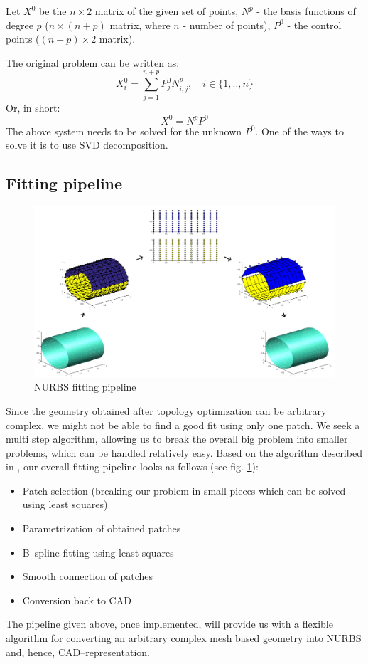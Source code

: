 Let $X^{0}$ be the $n \times 2$ matrix of the given set of points, $N^{p}$ - the basis functions of degree $p$ ($n \times (n+p)$ matrix, where $n$ - number of points), $P^{0}$ - the control points ($(n+p) \times 2$ matrix).

The original problem can be written as:
\begin{equation}
X_{i}^{0} = \sum\limits_{j=1}^{n+p} P_{j}^{0} N_{i,j}^{p}, \quad i \in \{1,..,n\}
\end{equation}
Or, in short:
\begin{equation}
X^{0} = N^{p} P^{0}
\end{equation}
The above system needs to be solved for the unknown $P^{0}$. One of the ways to solve it is to use SVD decomposition. 

\subsection{Fitting pipeline}
\begin{figure}
\centering
  \includegraphics[width=.85\linewidth]{Fitting_workflow.png}
  \caption{NURBS fitting pipeline}
  \label{fig:fitting_pipeline}
\end{figure}
Since the geometry obtained after topology optimization can be arbitrary complex, we might not be able to find a good fit using only one patch. We seek a multi step algorithm, allowing us to break the overall big problem into smaller problems, which can be handled relatively easy.
Based on the algorithm described in \cite{eck1996automatic}, our overall fitting pipeline looks as follows (see fig. \ref{fig:fitting_pipeline}):
\begin{itemize}
	\item Patch selection (breaking our problem in small pieces which can be solved using least squares)
	\item Parametrization of obtained patches
	\item B--spline fitting using least squares
	\item Smooth connection of patches
	\item Conversion back to CAD
\end{itemize}

The pipeline given above, once implemented, will provide us with a flexible algorithm for converting an arbitrary complex mesh based geometry into NURBS and, hence, CAD--representation.

